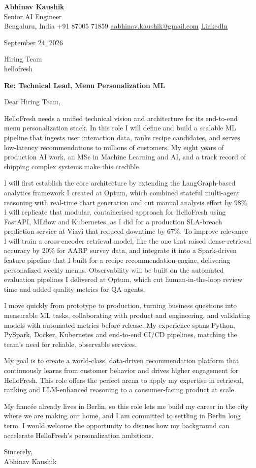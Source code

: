 \documentclass[11pt,a4paper]{article}
\begin{document}
{\Large\bfseries Abhinav Kaushik}\\
Senior AI Engineer\\
Bengaluru, India \textbar{} +91 87005 71859 \textbar{} \href{mailto:aabhinav.kaushik@gmail.com}{aabhinav.kaushik@gmail.com} \textbar{} \href{https://www.linkedin.com/in/abhinav-kaushik10/}{LinkedIn}  

September 24, 2026

Hiring Team\\
hellofresh

\textbf{Re: Technical Lead, Menu Personalization ML}

Dear Hiring Team,

HelloFresh needs a unified technical vision and architecture for its end-to-end menu personalization stack. In this role I will define and build a scalable ML pipeline that ingests user interaction data, ranks recipe candidates, and serves low-latency recommendations to millions of customers. My eight years of production AI work, an MSc in Machine Learning and AI, and a track record of shipping complex systems make this credible.

I will first establish the core architecture by extending the LangGraph-based analytics framework I created at Optum, which combined stateful multi-agent reasoning with real-time chart generation and cut manual analysis effort by 98\%. I will replicate that modular, containerised approach for HelloFresh using FastAPI, MLflow and Kubernetes, as I did for a production SLA-breach prediction service at Viavi that reduced downtime by 67\%. To improve relevance I will train a cross-encoder retrieval model, like the one that raised dense-retrieval accuracy by 20\% for AARP survey data, and integrate it into a Spark-driven feature pipeline that I built for a recipe recommendation engine, delivering personalized weekly menus. Observability will be built on the automated evaluation pipelines I delivered at Optum, which cut human-in-the-loop review time and added quality metrics for QA agents.

I move quickly from prototype to production, turning business questions into measurable ML tasks, collaborating with product and engineering, and validating models with automated metrics before release. My experience spans Python, PySpark, Docker, Kubernetes and end-to-end CI/CD pipelines, matching the team's need for reliable, observable services.

My goal is to create a world-class, data-driven recommendation platform that continuously learns from customer behavior and drives higher engagement for HelloFresh. This role offers the perfect arena to apply my expertise in retrieval, ranking and LLM-enhanced reasoning to a consumer-facing product at scale.

My fiancée already lives in Berlin, so this role lets me build my career in the city where we are making our home, and I am committed to settling in Berlin long term. I would welcome the opportunity to discuss how my background can accelerate HelloFresh's personalization ambitions.

Sincerely,\\[4pt]
Abhinav Kaushik
\end{document}

